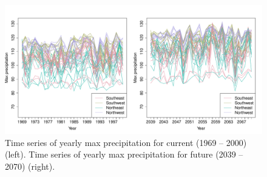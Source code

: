 \documentclass[11pt]{article}
\begin{document}
\begin{figure}[htbp]  %
  \centering
  \includegraphics[width=\linewidth]{plots/precip-ts}
  \caption{Time series of yearly max precipitation for current (1969 -- 2000) (left). Time series of yearly max precipitation for future (2039 -- 2070) (right).}
  \label{ebfig:tsprecip}
\end{figure}
\end{document}

